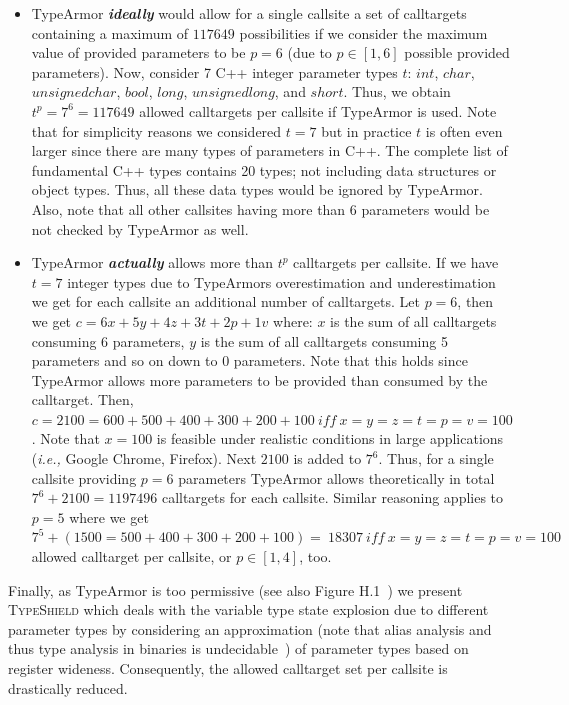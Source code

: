 \begin{itemize}
[leftmargin=.12in]
\item TypeArmor \textbf{\textit{ideally}} would allow for a single callsite a set of calltargets containing a maximum of $117649$ possibilities if we 
consider the maximum value of provided parameters to be $p=6$ (due to $p \in [1, 6]$ possible provided parameters). Now, consider 7 C++ integer parameter
types $t$: $int$, $char$, $unsigned char$, $bool$, $long$, $unsigned long$, and $short$. Thus, we obtain $t^{p}=7^{6}=117649$ allowed calltargets per 
callsite if TypeArmor is used. Note that for simplicity reasons we considered $t=7$ but in practice $t$ is often even larger since there are many types
of parameters in C++. The complete list of fundamental C++ types contains 20 types; not including data structures or object types. Thus, all these data 
types would be ignored by TypeArmor. Also, note that all other callsites having more than 6 parameters would be not checked by TypeArmor as well.

\item TypeArmor \textbf{\textit{actually}} allows more than $t^{p}$ calltargets per callsite. If we have $t=7$ integer types due to TypeArmors overestimation
and underestimation we get for each callsite an additional number of calltargets. Let $p=6$, then we get $c = 6x + 5y+ 4z + 3t + 2p + 1v$ where:
$x$ is the sum of all calltargets consuming 6 parameters, 
$y$ is the sum of all calltargets consuming 5 parameters 
and so on down to 0 parameters. Note that this holds since TypeArmor allows more parameters to be provided than consumed by the calltarget.
Then, $c = 2100 = 600 + 500 + 400 + 300 + 200 + 100 \ iff \ x=y=z=t=p=v=100$. 
Note that $x=100$ is feasible under realistic conditions in large applications (\textit{i.e.,} Google Chrome, Firefox). 
Next $2100$ is added to $7^{6}$. Thus, for a single callsite providing $p=6$ parameters TypeArmor allows theoretically in 
total $7^{6} + 2100 = 1197496$ calltargets for each callsite.
Similar reasoning applies to $p=5$ where we get $7^{5} + (1500 = 500 + 400 + 300 + 200 + 100) = \ 18307 \ iff \ x=y=z=t=p=v=100$ 
allowed calltarget per callsite, or $p \in [1, 4]$, too.
\end{itemize}

Finally, as TypeArmor is too permissive (see also Figure H.1~\cite{vci:asiaccs}) we present \textsc{TypeShield} which deals with the variable type state explosion due to different parameter types 
by considering an approximation (note that alias analysis and thus type analysis in binaries is undecidable~\cite{alias:undecidable}) of parameter types 
based on register wideness. Consequently, the allowed calltarget set per callsite is drastically reduced.

